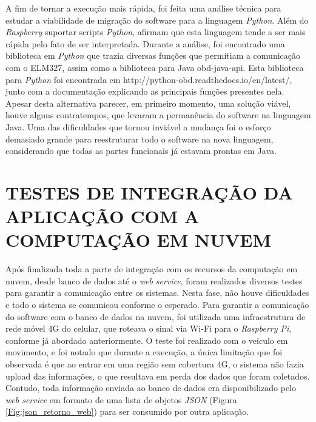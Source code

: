 A fim de tornar a execução mais rápida, foi feita uma análise técnica para estudar a viabilidade de migração do software para a linguagem \textit{Python}. Além do \textit{Raspberry} suportar scripts \textit{Python},  afirmam que esta linguagem tende a ser mais rápida pelo fato de ser interpretada. Durante a análise, foi encontrado uma biblioteca em \textit{Python} que trazia diversas funções que permitiam a comunicação com o ELM327, assim como a biblioteca para Java obd-java-api. Esta biblioteca para \textit{Python} foi encontrada em http://python-obd.readthedocs.io/en/latest/, junto com a documentação explicando as principais funções presentes nela. Apesar desta alternativa parecer, em primeiro momento, uma solução viável, houve alguns contratempos, que levaram a permanência do software na linguagem Java. Uma das dificuldades que tornou inviável a mudança foi o esforço demasiado grande para reestruturar todo o software na nova linguagem, considerando que todas as partes funcionais já estavam prontas em Java.

\section{TESTES DE INTEGRAÇÃO DA APLICAÇÃO COM A COMPUTAÇÃO EM NUVEM}
Após finalizada toda a parte de integração com os recursos da computação em nuvem, desde banco de dados até o \textit{web service}, foram realizados diversos testes para garantir a comunicação entre os sistemas. Nesta fase, não houve dificuldades e todo o sistema se comunicou conforme o esperado. Para garantir a comunicação do software com o banco de dados na nuvem, foi utilizada uma infraestrutura de rede móvel 4G do celular, que roteava o sinal via Wi-Fi para o \textit{Raspberry Pi}, conforme já abordado anteriormente. O teste foi realizado com o veículo em movimento, e foi notado que durante a execução, a única limitação que foi observada é que ao entrar em uma região sem cobertura 4G, o sistema não fazia upload das informações, o que resultava em perda dos dados que foram coletados. Contudo, toda informação enviada ao banco de dados era disponibilizado pelo \textit{web service} em formato de uma lista de objetos \textit{JSON} (Figura \ref{Fig:json_retorno_web}) para ser consumido por outra aplicação.

